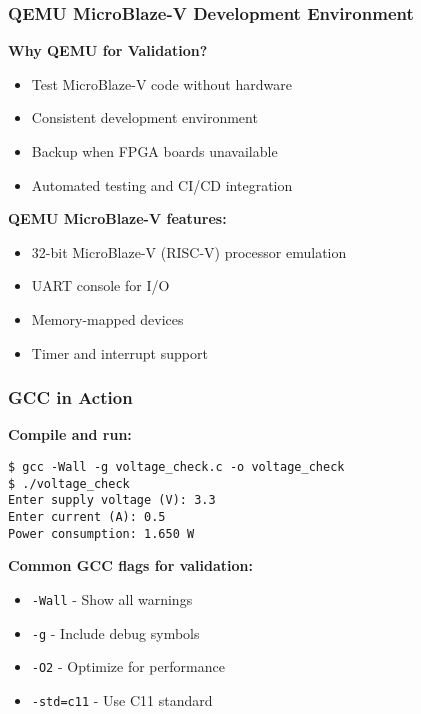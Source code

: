 \documentclass{beamer}
\begin{document}
\begin{frame}
\frametitle{QEMU MicroBlaze-V Development Environment}
\textbf{Why QEMU for Validation?}
\begin{itemize}
    \item Test MicroBlaze-V code without hardware
    \item Consistent development environment
    \item Backup when FPGA boards unavailable
    \item Automated testing and CI/CD integration
\end{itemize}

\vspace{0.5cm}
\textbf{QEMU MicroBlaze-V features:}
\begin{itemize}
    \item 32-bit MicroBlaze-V (RISC-V) processor emulation
    \item UART console for I/O
    \item Memory-mapped devices
    \item Timer and interrupt support
\end{itemize}
\end{frame}

\begin{frame}[fragile]
\frametitle{GCC in Action}
\textbf{Compile and run:}
\begin{verbatim}
$ gcc -Wall -g voltage_check.c -o voltage_check
$ ./voltage_check
Enter supply voltage (V): 3.3
Enter current (A): 0.5
Power consumption: 1.650 W
\end{verbatim}

\textbf{Common GCC flags for validation:}
\begin{itemize}
    \item \texttt{-Wall} - Show all warnings
    \item \texttt{-g} - Include debug symbols
    \item \texttt{-O2} - Optimize for performance
    \item \texttt{-std=c11} - Use C11 standard
\end{itemize}
\end{frame}
\end{document}
